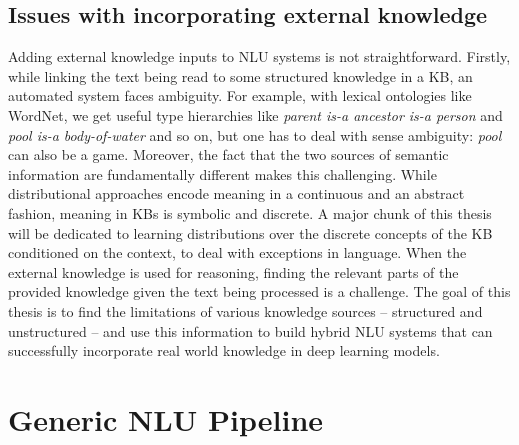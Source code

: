 \subsection{Issues with incorporating external knowledge}
Adding external knowledge inputs to NLU systems is not straightforward.  Firstly, while linking the text being read to some structured knowledge
in a KB, an automated system faces ambiguity. For example, with lexical ontologies like WordNet, 
we get useful type hierarchies like \textit{parent is-a ancestor is-a person} and \textit{pool is-a body-of-water} 
and so on, but one has to deal with sense ambiguity: \textit{pool} can also be a game. Moreover, the fact that the two sources of semantic information are fundamentally different 
makes this challenging. While distributional approaches encode meaning in a
continuous and an abstract fashion, meaning in KBs is symbolic and discrete. A major chunk of this thesis will be dedicated to learning 
distributions over the discrete concepts of the KB conditioned on the context, to deal with exceptions in language.
When the external knowledge is used for reasoning, finding the 
relevant parts of the provided knowledge given the text being processed is a challenge. 
The goal of this thesis is to find the limitations of various knowledge sources -- structured and unstructured -- and use this information 
to build hybrid NLU systems that can successfully incorporate real world knowledge in deep learning models.


\section{Generic NLU Pipeline}


